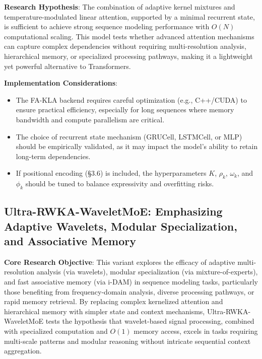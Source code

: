 \documentclass{article}
\begin{document}
\textbf{Research Hypothesis}: The combination of adaptive kernel mixtures and temperature-modulated linear attention, supported by a minimal recurrent state, is sufficient to achieve strong sequence modeling performance with $O(N)$ computational scaling. This model tests whether advanced attention mechanisms can capture complex dependencies without requiring multi-resolution analysis, hierarchical memory, or specialized processing pathways, making it a lightweight yet powerful alternative to Transformers.

\textbf{Implementation Considerations}:
\begin{itemize}
    \item The FA-KLA backend requires careful optimization (e.g., C++/CUDA) to ensure practical efficiency, especially for long sequences where memory bandwidth and compute parallelism are critical.
    \item The choice of recurrent state mechanism (GRUCell, LSTMCell, or MLP) should be empirically validated, as it may impact the model's ability to retain long-term dependencies.
    \item If positional encoding (\S3.6) is included, the hyperparameters $K$, $\rho_k$, $\omega_k$, and $\phi_k$ should be tuned to balance expressivity and overfitting risks.
\end{itemize}

\subsection{Ultra-RWKA-WaveletMoE: Emphasizing Adaptive Wavelets, Modular Specialization, and Associative Memory}
\textbf{Core Research Objective}: This variant explores the efficacy of adaptive multi-resolution analysis (via wavelets), modular specialization (via mixture-of-experts), and fast associative memory (via i-DAM) in sequence modeling tasks, particularly those benefiting from frequency-domain analysis, diverse processing pathways, or rapid memory retrieval. By replacing complex kernelized attention and hierarchical memory with simpler state and context mechanisms, Ultra-RWKA-WaveletMoE tests the hypothesis that wavelet-based signal processing, combined with specialized computation and $O(1)$ memory access, excels in tasks requiring multi-scale patterns and modular reasoning without intricate sequential context aggregation.
\end{document}
